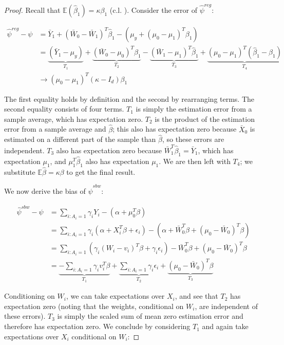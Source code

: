 \begin{proof}
Recall that $\mathbb{E}(\hat{\beta}_1) = \kappa\beta_1$ (c.l. \cite{gleser1992importance}). Consider the error of $\hat{\psi}^{reg}$: 

\begin{align*}
    \hat{\psi}^{reg} - \psi &= \bar{Y}_1 + (\bar{W}_0 - \bar{W}_1)^T\hat{\beta}_1 - (\mu_y + (\mu_0 - \mu_1)^T\beta_1) \\
    &= \underbrace{(\bar{Y}_1 - \mu_y)}_{T_1} + \underbrace{(\bar{W}_0 - \mu_0)^T\hat{\beta}_1}_{T_2} - \underbrace{(\bar{W}_1 - \mu_1)^T\hat{\beta}_1}_{T_3} + \underbrace{(\mu_0 - \mu_1)^T(\hat{\beta}_1 - \beta_1)}_{T_4} \\
    & \to (\mu_0 - \mu_1)^T(\kappa - I_d)\beta_1
\end{align*}

The first equality holds by definition and the second by rearranging terms. The second equality consists of four terms. $T_1$ is simply the estimation error from a sample average, which has expectation zero. $T_2$ is the product of the estimation error from a sample average and $\hat{\beta}$; this also has expectation zero because $\bar{X}_0$ is estimated on a different part of the sample than $\hat{\beta}$, so these errors are independent. $T_3$ also has expectation zero because $\bar{W}_1^T\hat{\beta}_1 = \bar{Y}_1$, which has expectation $\mu_1$, and $\mu_1^T\hat{\beta}_1$ also has expectation $\mu_1$. We are then left with $T_4$; we substitute $\mathbb{E}{\hat{\beta}} = \kappa\beta$ to get the final result. 

We now derive the bias of $\hat{\psi}^{sbw}$:

\begin{align*}
    \hat{\psi}^{sbw} - \psi &= \sum_{i: A_i = 1}\gamma_iY_i - (\alpha + \mu_0^T\beta) \\
    &= \sum_{i: A_i = 1} \gamma_i(\alpha + X_i^T\beta + \epsilon_i) - (\alpha + \bar{W}_0^T\beta + (\mu_0 - \bar{W}_0)^T\beta) \\
    &= \sum_{i: A_i = 1} (\gamma_i(W_i - v_i)^T\beta + \gamma_i\epsilon_i) - \bar{W}_0^T\beta + (\mu_0 - \bar{W}_0)^T\beta \\
    &= \underbrace{-\sum_{i: A_i = 1}\gamma_iv_i^T\beta}_{T_1} + \underbrace{\sum_{i: A_i = 1}\gamma_i\epsilon_i}_{T_2}  + \underbrace{(\mu_0 - \bar{W}_0)^T\beta}_{T_3}
\end{align*}

Conditioning on $W_i$, we can take expectations over $X_i$, and see that $T_2$ has expectation zero (noting that the weights, conditional on $W_i$, are independent of these errors). $T_3$ is simply the scaled sum of mean zero estimation error and therefore has expectation zero. We conclude by considering $T_1$ and again take expectations over $X_i$ conditional on $W_i$: 


\end{proof}
